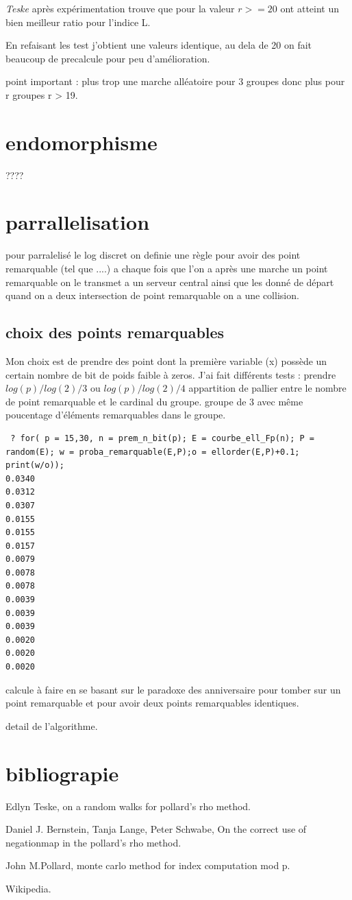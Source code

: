 \documentclass[a4paper,10pt]{report}
\begin{document}
\textit{Teske} après expérimentation trouve que pour la valeur $r >= 20$ ont atteint un bien meilleur ratio pour l'indice L.

En refaisant les test j'obtient une valeurs identique, au dela de 20 on fait beaucoup de precalcule pour peu d'amélioration.


point important : plus trop une marche alléatoire pour 3 groupes donc plus pour r groupes r > 19.

\chapter{endomorphisme}
 
 ????

\chapter{parrallelisation}

pour parralelisé le log discret on definie une règle pour avoir des point remarquable (tel que ....) 
a chaque fois que l'on a après une marche un point remarquable on le transmet a un serveur central ainsi que les donné de départ
quand on  a deux intersection de point remarquable on a une collision.

\section{choix des points remarquables}

Mon choix est de prendre des point dont la première variable (x) possède un certain nombre de bit de poids faible à zeros.
J'ai fait différents tests : prendre $log(p)/log(2)/3$ ou $log(p)/log(2)/4$ appartition de pallier entre le nombre de point remarquable et le cardinal du groupe.
groupe de 3 avec même poucentage d'éléments remarquables dans le groupe.

\begin{verbatim}
 ? for( p = 15,30, n = prem_n_bit(p); E = courbe_ell_Fp(n); P = random(E); w = proba_remarquable(E,P);o = ellorder(E,P)+0.1; print(w/o));
0.0340
0.0312
0.0307
0.0155
0.0155
0.0157
0.0079
0.0078
0.0078
0.0039
0.0039
0.0039
0.0020
0.0020
0.0020

\end{verbatim}



calcule à faire en se basant sur le paradoxe des anniversaire pour tomber sur un point remarquable et pour avoir deux points remarquables identiques.

detail de l'algorithme.

\chapter{bibliograpie}
Edlyn Teske, on a random walks for pollard's rho method.

Daniel J. Bernstein, Tanja Lange, Peter Schwabe, On the correct use of negationmap in the pollard's rho method.

John M.Pollard, monte carlo method for index computation mod p.

Wikipedia.
\end{document}
